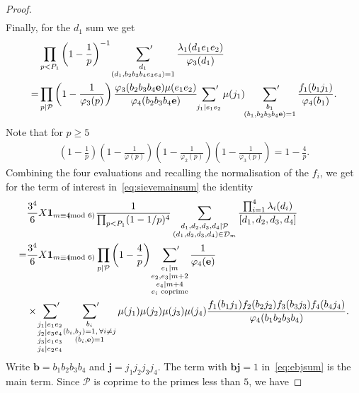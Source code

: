 \documentclass[12pt]{amsart}
\theoremstyle{definition}
\theoremstyle{remark}
\numberwithin{equation}{section}
\newcommand{\1}{\mathbf{1}}
\let\oldpmod\pmod
\renewcommand{\pmod}[1]{\hspace{-0.12cm}\oldpmod {#1}}
\begin{document}
\begin{proof}
\begin{align*}
	\end{align*}
	Finally, for the $d_1$ sum we get 
	\begin{align*}
		&\prod_{p<P_1}\left(1-\frac{1}{p}\right)^{-1}\sideset{}{'}\sum_{\substack{d_1\\ (d_1,b_2 b_3 b_4 e_3e_4)=1}} \frac{\lambda_1(d_1e_1e_2)}{\varphi_3(d_1)}\\
		=&\prod_{p\mid \mathcal{P}}\left(1-\frac{1}{\varphi_3(p)}\right)\frac{\varphi_3(b_2b_3b_4\mathbf{e})\mu(e_1 e_2) }{\varphi_4(b_2b_3b_4\mathbf{e})} \sideset{}{'}\sum_{j_1\mid e_1e_2}\mu(j_1)\sideset{}{'}\sum_{\substack{b_1\\ (b_1,b_2 b_3 b_4\mathbf{e})=1}}\frac{f_1(b_1j_1)}{\varphi_4(b_1)}.
		\end{align*}
	Note that for $p\geq 5$
	\begin{align*}
		\left(1-\frac{1}{p}\right)    \left(1-\frac{1}{\varphi(p)}\right)\left(1-\frac{1}{\varphi_2(p)}\right)\left(1-\frac{1}{\varphi_3(p)}\right)=1-\frac{4}{p}.
	\end{align*}
	Combining the four evaluations and recalling the normalisation of the $f_i$, we get for the term of interest in~\eqref{eq:sievemainsum} the identity
	\begin{align}
    \nonumber & \frac{3^4}{6} X\1_{m\equiv 4 \pmod 6} \frac{1}{\prod_{p<P_1}(1-1/p)^4}  \sum_{\substack{d_1,d_2,d_3,d_4\mid\mathcal{P}\\ (d_1,d_2,d_3,d_4)\in \mathcal{D}_m}} \frac{\prod_{i=1}^4\lambda_{i}(d_i)}{[d_1,d_2,d_3,d_4]}\\
		\nonumber=& \frac{3^4}{6} X\1_{m\equiv 4 \pmod 6} \prod_{p\mid \mathcal{P}}\left(1-\frac{4}{p}\right)\sideset{}{'}\sum_{\substack{e_1\mid m\\ e_2, e_3\mid  m+2 \\ e_4\mid m+4 \\ e_i \text{ coprime}}}\frac{1}{\varphi_4(\mathbf{e})}   \\
		& \times \sideset{}{'}\sum_{\substack{j_1\mid e_1e_2\\ j_2\mid e_3e_4\\ j_3\mid e_1e_3\\ j_4\mid e_2 e_4}}\sideset{}{'}\sum_{\substack{b_i\\ (b_i,b_j)=1,\,\forall i\neq j\\ (b_i,\mathbf{e})=1}} \mu(j_1)\mu(j_2)\mu(j_3)\mu(j_4)\frac{f_1(b_1j_1)f_2(b_2j_2)f_3(b_3j_3)f_4(b_4j_4)}{\varphi_4(b_1b_2b_3b_4)}. \label{eq:ebjsum}
	\end{align}
	Write $\mathbf{b}=b_1b_2b_3b_4$ and $\mathbf{j}=j_1j_2j_3j_4$. The term with $\mathbf{b}\mathbf{j}=1$ in~\eqref{eq:ebjsum} is the main term. Since $\mathcal{P}$ is coprime to the primes less than $5$, we have

\end{proof}
\end{document}
